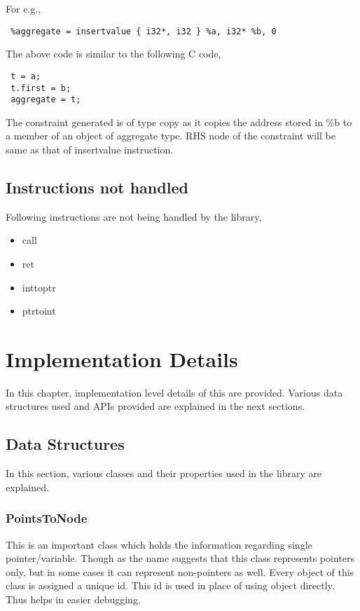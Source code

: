 \documentclass[a4paper,11pt]{report}
\begin{document}
For e.g.,

\begin{lstlisting}
 %aggregate = insertvalue { i32*, i32 } %a, i32* %b, 0
\end{lstlisting}

The above code is similar to the following C code,

\begin{lstlisting}
 t = a;
 t.first = b;
 aggregate = t;
\end{lstlisting}

The constraint generated is of type copy as it copies the address stored in \%b 
to a member of an object of aggregate type. RHS node of the constraint will be 
same as that of insertvalue instruction.

\section{Instructions not handled}
Following instructions are not being handled by the library,

\begin{itemize}
    \item call
    \item ret
    \item inttoptr
    \item ptrtoint
\end{itemize}

\chapter{Implementation Details}
In this chapter, implementation level details of this are provided. Various 
data structures used and APIs provided are explained in the next sections.

\section{Data Structures}
In this section, various classes and their properties used in the library are 
explained.

\subsection{PointsToNode}
This is an important class which holds the information regarding single 
pointer/variable. Though as the name suggests that this class represents 
pointers only, but in some cases it can represent non-pointers as well.
Every object of this class is assigned a unique id. This id is used in place 
of using object directly. Thus helps in easier debugging.
\end{document}
